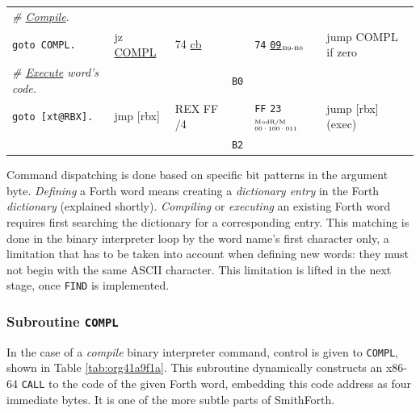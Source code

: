 \documentclass[a4paper,12pt,final]{article}
\begin{document}
\begin{table}[!htbp]
\begin{adjustwidth}{-1cm}{-1cm}
\begin{center}
\begin{tabular}{l|ll|l|lH}
\hspace{2em}     \emph{\# \uline{Compile}.} &  &  &  &  & \\[0pt]
\hspace{2em}     \texttt{goto COMPL.} & jz \uline{COMPL} & 74 \uline{cb} &  & \texttt{74} \uline{\texttt{09}}​\(_{\text{\tiny B9-B0}}\) & jump COMPL if zero\\[0pt]
\hspace{1em} \emph{\# \uline{Execute} word's code.} &  &  & \texttt{B0} &  & \\[0pt]
\hspace{1em} \texttt{goto [xt@RBX].} & jmp [rbx] & REX FF /4 &  & \texttt{FF} \texttt{23}​\(^{\text{\tiny ModR/M}}_{\text{\tiny 00·100·011}}\) & jump [rbx] (exec)\\[0pt]
 &  &  & \texttt{B2} &  & \\[0pt]
\end{tabular}

\end{center}
\normalsize \end{adjustwidth} \end{table} \vspace{0}

Command dispatching is done based on specific bit patterns in the
argument byte.  \emph{Defining} a Forth word means creating a \emph{dictionary
entry} in the Forth \emph{dictionary} (explained shortly).  \emph{Compiling} or
\emph{executing} an existing Forth word requires first searching the
dictionary for a corresponding entry.  This matching is done in the
binary interpreter loop by the word name's first character only, a
limitation that has to be taken into account when defining new words:
they must not begin with the same ASCII character.  This limitation is
lifted in the next stage, once \texttt{FIND} is implemented.
\pagebreak

\subsubsection{Subroutine \texttt{COMPL}}
\label{sec:org99c01e8}

In the case of a \emph{compile} binary interpreter command, control is
given to \texttt{COMPL}, shown in Table \ref{tab:org41a9f1a}.  This subroutine
dynamically constructs an x86-64 \texttt{CALL} to the code of the given Forth
word, embedding this code address as four immediate bytes.  It is one
of the more subtle parts of SmithForth.
\end{document}
